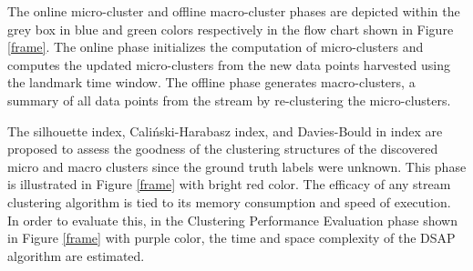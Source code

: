 The online micro-cluster and offline macro-cluster phases are depicted within the grey box in blue and green colors respectively in the flow chart shown in Figure \ref{frame}. The online phase initializes the computation of micro-clusters and computes the updated micro-clusters from the new data points harvested using the landmark time window. The offline phase generates macro-clusters, a summary of all data points from the stream by re-clustering the micro-clusters. 

The silhouette index, Caliński-Harabasz index, and Davies-Bould in index are proposed to assess the goodness of  the clustering structures of the discovered micro and macro clusters since the ground truth labels were unknown. This phase is illustrated in Figure \ref{frame} with bright red color. The efficacy of any stream clustering algorithm is tied to its memory consumption and speed of execution. In order to evaluate this, in the Clustering Performance Evaluation phase shown in Figure \ref{frame} with purple color, the time and space complexity of the DSAP algorithm are estimated. 

























